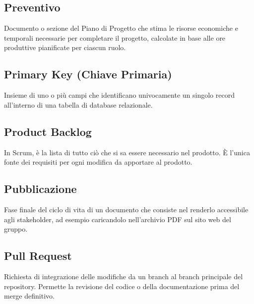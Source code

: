 \documentclass[a4paper, 11pt, oneside]{scrartcl} %
\begin{document}
\subsection*{Preventivo}
Documento o sezione del Piano di Progetto che stima le risorse economiche e temporali necessarie per completare il progetto, calcolate in base alle ore produttive pianificate per ciascun ruolo.
\vspace{0.5cm}

\subsection*{Primary Key (Chiave Primaria)}
Insieme di uno o più campi che identificano univocamente un singolo record all'interno di una tabella di database relazionale.
\vspace{0.5cm}

\subsection*{Product Backlog}
In Scrum, è la lista di tutto ciò che si sa essere necessario nel prodotto. È l'unica fonte dei requisiti per ogni modifica da apportare al prodotto.
\vspace{0.5cm}

\subsection*{Pubblicazione}


Fase finale del ciclo di vita di un documento che consiste nel renderlo accessibile agli stakeholder, ad esempio caricandolo nell'archivio PDF sul sito web del gruppo.

\vspace{0.5cm}

\subsection*{Pull Request}


Richiesta di integrazione delle modifiche da un branch al branch principale del repository. Permette la revisione del codice o della documentazione prima del merge definitivo.
\end{document}
